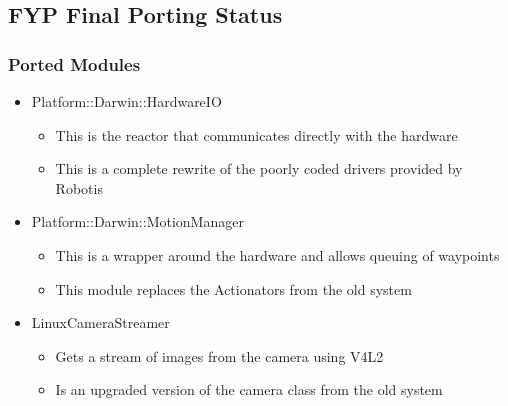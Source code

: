 \documentclass{beamer}
\begin{document}
\subsection{FYP Final Porting Status}
\begin{frame}
	\frametitle{Ported Modules}
	\begin{itemize}
		\item Platform::Darwin::HardwareIO
			\begin{itemize}
				\item This is the reactor that communicates directly with the hardware
				\item This is a complete rewrite of the poorly coded drivers provided by Robotis
			\end{itemize}

		\item Platform::Darwin::MotionManager
			\begin{itemize}
				\item This is a wrapper around the hardware and allows queuing of waypoints
				\item This module replaces the Actionators from the old system
			\end{itemize}

		\item LinuxCameraStreamer
			\begin{itemize}
				\item Gets a stream of images from the camera using V4L2
				\item Is an upgraded version of the camera class from the old system
			\end{itemize}
		\end{itemize}
\end{frame}
\end{document}
